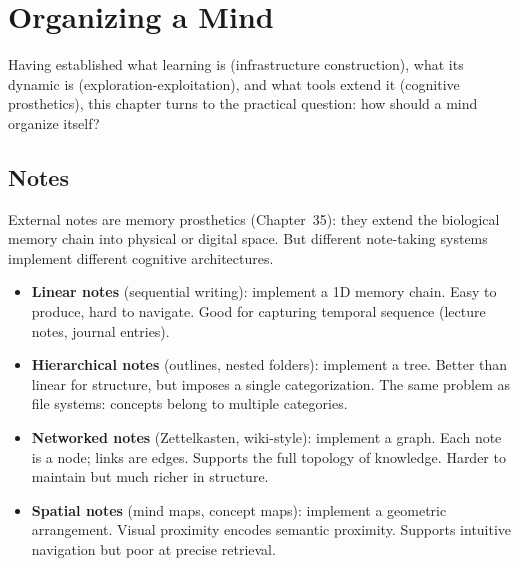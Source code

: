 \chapter{Organizing a Mind}



Having established what learning is (infrastructure construction),
what its dynamic is (exploration-exploitation), and what tools extend
it (cognitive prosthetics), this chapter turns to the practical question:
how should a mind organize itself?

\section{Notes}

External notes are memory prosthetics (Chapter~35): they extend the
biological memory chain into physical or digital space. But different
note-taking systems implement different cognitive architectures.

\begin{itemize}
  \item \textbf{Linear notes} (sequential writing): implement a
        1D memory chain. Easy to produce, hard to navigate. Good for
        capturing temporal sequence (lecture notes, journal entries).
  \item \textbf{Hierarchical notes} (outlines, nested folders):
        implement a tree. Better than linear for structure, but imposes
        a single categorization. The same problem as file systems:
        concepts belong to multiple categories.
  \item \textbf{Networked notes} (Zettelkasten, wiki-style):
        implement a graph. Each note is a node; links are edges.
        Supports the full topology of knowledge. Harder to maintain
        but much richer in structure.
  \item \textbf{Spatial notes} (mind maps, concept maps):
        implement a geometric arrangement. Visual proximity encodes
        semantic proximity. Supports intuitive navigation but
        poor at precise retrieval.
\end{itemize}

